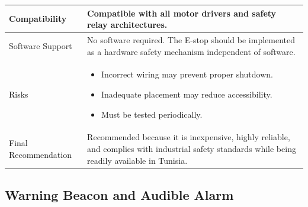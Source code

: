 \documentclass[12pt,a4paper]{article}
\begin{document}
\begin{longtable}{|p{4cm}|p{10cm}|}
Compatibility &
Compatible with all motor drivers and safety relay architectures. \\
\hline

Software Support &
No software required. The E-stop should be implemented as a hardware safety mechanism independent of software. \\
\hline

Risks &
\begin{itemize}
\item Incorrect wiring may prevent proper shutdown.
\item Inadequate placement may reduce accessibility.
\item Must be tested periodically.
\end{itemize}
\\
\hline

Final Recommendation &
Recommended because it is inexpensive, highly reliable, and complies with industrial safety standards while being readily available in Tunisia.
\\
\hline

\end{longtable}

\subsection{Warning Beacon and Audible Alarm}
\end{document}
